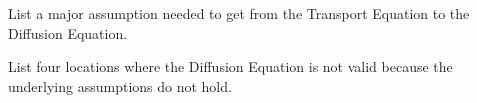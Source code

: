 \documentclass[12pt]{exam}
\begin{document}
\begin{questions}
\vspace*{2em}
\addpoints
\question[10] List a major assumption needed to get from the Transport Equation to the Diffusion Equation.

\begin{solution}

\end{solution}

\vspace*{2em}
\addpoints
\question[10] List four locations where the Diffusion Equation is not valid because the underlying assumptions do not hold.

\end{questions}
\end{document}
